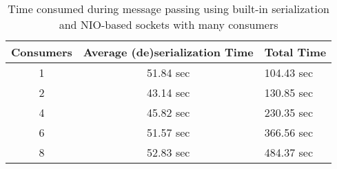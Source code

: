 \begin{table}
\centering
\caption{Time consumed during message passing using built-in serialization and NIO-based sockets with many consumers}
\begin{tabular}{|c|c|l|} \hline 
Consumers & Average (de)serialization Time  & Total Time \\ \hline
1 &	51.84 sec &	 104.43 sec	\\ \hline
2 &	43.14 sec & 130.85 sec	\\ \hline
4 &	45.82 sec &	230.35 sec	\\ \hline
6 &	51.57 sec &	 366.56 sec	\\ \hline
8 &	52.83 sec &	 484.37 sec	\\ \hline
\end{tabular}
\label{tab:time-consumed-in-communication}
\end{table}
